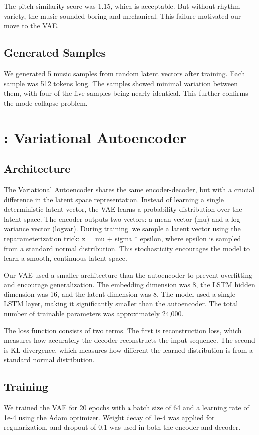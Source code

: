 \documentclass{article}
\theoremstyle{plain}
\theoremstyle{definition}
\theoremstyle{remark}
\begin{document}
The pitch similarity score was 1.15, which is acceptable. But without rhythm variety, the music sounded boring and mechanical. This failure motivated our move to the VAE.


\subsection{Generated Samples}
We generated 5 music samples from random latent vectors after training. Each sample was 512 tokens long. The samples showed minimal variation between them, with four of the five samples being nearly identical. This further confirms the mode collapse problem.

\section{: Variational Autoencoder}

\subsection{Architecture}

The Variational Autoencoder shares the same encoder-decoder, but with a crucial difference in the latent space representation. Instead of learning a single deterministic latent vector, the VAE learns a probability distribution over the latent space. The encoder outputs two vectors: a mean vector (mu) and a log variance vector (logvar). During training, we sample a latent vector using the reparameterization trick: z = mu + sigma * epsilon, where epsilon is sampled from a standard normal distribution. This stochasticity encourages the model to learn a smooth, continuous latent space.

Our VAE used a smaller architecture than the autoencoder to prevent overfitting and encourage generalization. The embedding dimension was 8, the LSTM hidden dimension was 16, and the latent dimension was 8. The model used a single LSTM layer, making it significantly smaller than the autoencoder. The total number of trainable parameters was approximately 24,000.

The loss function consists of two terms. The first is reconstruction loss, which measures how accurately the decoder reconstructs the input sequence. The second is KL divergence, which measures how different the learned distribution is from a standard normal distribution.

\subsection{Training}
We trained the VAE for 20 epochs with a batch size of 64 and a learning rate of 1e-4 using the Adam optimizer. Weight decay of 1e-4 was applied for regularization, and dropout of 0.1 was used in both the encoder and decoder.
\end{document}
